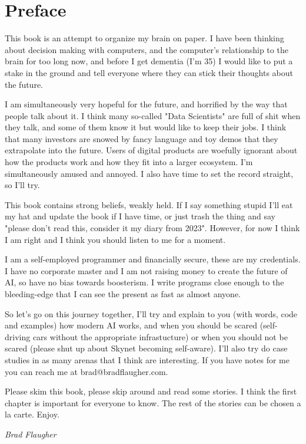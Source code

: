 \chapter*{Preface}

This book is an attempt to organize my brain on paper. I have been thinking about decision making with computers, and the computer's relationship to the brain for too long now, and before I get dementia (I'm 35) I would like to put a stake in the ground and tell everyone where they can stick their thoughts about the future. 

I am simultaneously very hopeful for the future, and horrified by the way that people talk about it. I think many so-called "Data Scientists" are full of shit when they talk, and some of them know it but would like to keep their jobs. I think that many investors are snowed by fancy language and toy demos that they extrapolate into the future. Users of digital products are woefully ignorant about how the products work and how they fit into a larger ecosystem. I'm simultaneously amused and annoyed. I also have time to set the record straight, so I'll try. 

This book contains strong beliefs, weakly held. If I say something stupid I'll eat my hat and update the book if I have time, or just trash the thing and say "please don't read this, consider it my diary from 2023". However, for now I think I am right and I think you should listen to me for a moment.

I am a self-employed programmer and financially secure, these are my credentials. I have no corporate master and I am not raising money to create the future of AI, so have no bias towards boosterism. I write programs close enough to the bleeding-edge that I can see the present as fast as almost anyone.

So let's go on this journey together, I'll try and explain to you (with words, code and examples) how modern AI works, and when you should be scared (self-driving cars without the appropriate infrastucture) or when you should not be scared (please shut up about Skynet becoming self-aware). I'll also try do case studies in as many arenas that I think are interesting. If you have notes for me you can reach me at brad@bradflaugher.com.

Please skim this book, please skip around and read some stories. I think the first chapter is important for everyone to know. The rest of the stories can be chosen a la carte. Enjoy.

\begin{flushright}
	\textit{Brad Flaugher}
\end{flushright}
